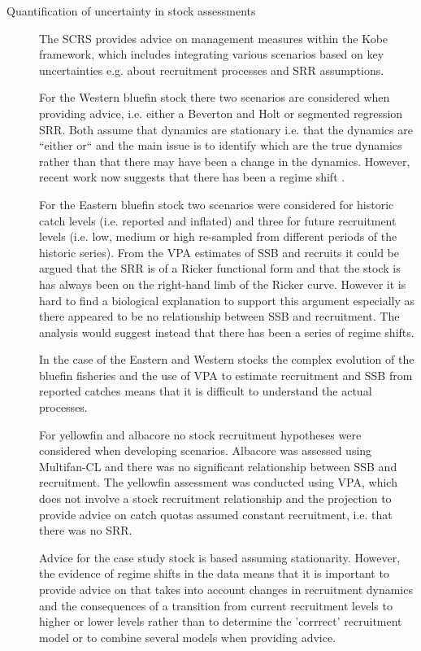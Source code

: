\documentclass[a4paper, 10pt]{article}
\begin{document}
\begin{description}

\item[Quantification of uncertainty in stock assessments]

The SCRS provides advice on management measures within the Kobe framework, which includes integrating
various scenarios based on key uncertainties e.g. about recruitment processes and SRR assumptions. 

For the Western bluefin stock there two scenarios are considered when providing advice, i.e.
either a Beverton and Holt or segmented regression SRR. Both assume that dynamics are stationary i.e. 
that the dynamics are ``either or`` and the main issue is to identify which are the true dynamics rather 
than that there may have been a change in the dynamics. However, recent work now suggests that there 
has been a regime shift \cite{fromentin2013oceanographic}.

For the Eastern bluefin stock two scenarios were considered for historic catch levels (i.e. reported and inflated)
and three for future recruitment levels (i.e. low, medium or high re-sampled from different periods of the historic 
series). From the VPA estimates of SSB and recruits 
it could be argued that the SRR is of a Ricker functional form and that the stock is has always been on the right-hand
limb of the Ricker curve. 
However it is hard to find a biological explanation to support this argument especially as there appeared to be no
relationship between SSB and recruitment. The analysis would suggest instead that there has been
a series of regime shifts. 

In the case of the Eastern and Western stocks the complex evolution of the bluefin fisheries and the use of
VPA to estimate recruitment and SSB from reported catches means that it is difficult to
understand the actual processes.

For yellowfin and albacore no stock recruitment hypotheses were considered when developing scenarios. Albacore
was assessed using Multifan-CL \cite{fournier_multifan-cl} and there was no significant relationship between SSB and
recruitment. The yellowfin assessment was conducted using VPA, which does not involve a stock recruitment relationship
and the projection to provide advice on catch quotas assumed constant recruitment, i.e. that there was no SRR.

Advice for the case study stock is based assuming stationarity.
However, the evidence of regime shifts in the data means that it is important to provide advice on 
that takes into account changes in recruitment dynamics and the consequences of a transition from 
current recruitment levels to higher or lower levels rather than to determine the 'corrrect' recruitment 
model or to combine several models when providing advice. 



\end{description}
\end{document}
